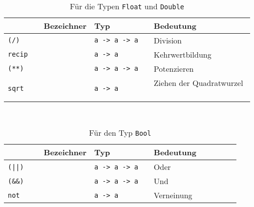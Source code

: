 \documentclass[
  10pt,                   %
  DIV12,
  german,                 %
  oneside,                %
  parskip=half,           %
  headings=normal,        %
  captions=tableheading,  %
]{scrartcl}
\begin{document}
\begin{table}[H]
	\centering
    \begin{tabular}{lll} %
        Bezeichner & Typ         & Bedeutung         \\ \hline
		\lstinline|(/)|	 	& \lstinline|a -> a -> a| & Division\\
		\lstinline|recip| 	& \lstinline|a -> a| & Kehrwertbildung\\
		\lstinline|(**)| 	& \lstinline|a -> a -> a| & Potenzieren\\
		\lstinline|sqrt| 	& \lstinline|a -> a| & Ziehen der Quadratwurzel %
    \end{tabular}
\caption{Für die Typen \lstinline|Float| und \lstinline|Double|}
\end{table}
\begin{table}[H]
	\centering
    \begin{tabular}{lll} %
        Bezeichner & Typ         & Bedeutung         \\ \hline
		\lstinline!(||)!	& \lstinline|a -> a -> a| & Oder\\
		\lstinline|(&&)| 	& \lstinline|a -> a -> a| & Und\\
		\lstinline|not| 	& \lstinline|a -> a| & Verneinung %
    \end{tabular}
\caption{Für den Typ \lstinline|Bool|}
\end{table}
\newpage
\renewcommand*\thesubsection{\alph{subsection})}
\end{document}
